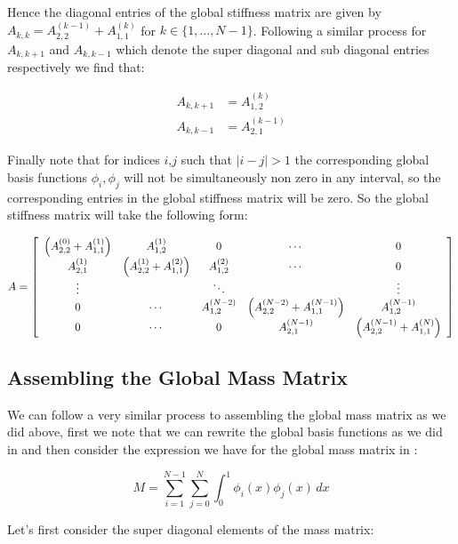Hence the diagonal entries of the global stiffness matrix are given by $A_{k,k} = A^{(k-1)}_{2,2} + A^{(k)}_{1,1}$ for
$k \in \{1, \ldots, N - 1\}$. Following a similar process for $A_{k,k+1}$ and $A_{k,k-1}$ which denote the super diagonal
and sub diagonal entries respectively we find that:

\begin{align*}
	A_{k,k+1} &= A^{(k)}_{1,2} \\
    A_{k,k-1} &= A^{(k-1)}_{2,1}
\end{align*}

Finally note that for indices $i$,$j$ such that $|i - j| > 1$ the corresponding global basis functions $\phi_i, \phi_j$
will not be simultaneously non zero in any interval, so the corresponding entries in the global stiffness matrix will be 
zero. So the global stiffness matrix will take the following form:

\begin{equation}\label{eq:oned-deterministic-global-stiffness}
	A = \left[\begin{array}{c c c c c}
    	 \left(A^{(0)}_{2,2} + A^{(1)}_{1,1}\right) & A^{(1)}_{1,2} & 0 & \cdots & 0 \\
         A^{(1)}_{2,1} & \left(A^{(1)}_{2,2} + A^{(2)}_{1,1}\right) & A^{(2)}_{1,2} & \cdots & 0 \\
         \vdots & & \ddots  & & \vdots \\
         0 & \cdots & A^{(N-2)}_{1,2} & \left(A^{(N-2)}_{2,2} + A^{(N-1)}_{1,1}\right)& A^{(N-1)}_{1,2} \\
         0 & \cdots & 0 & A^{(N-1)}_{2,1} & \left(A^{(N-1)}_{2,2} + A^{(N)}_{1,1}\right)
  		\end{array}\right]
\end{equation}

\subsection{Assembling the Global Mass Matrix}

We can follow a very similar process to assembling the global mass matrix as we did above, first we note that we can rewrite
the global basis functions as we did in  and then consider the expression
we have for the global mass matrix in :

\[
	M = \sum_{i=1}^{N-1}\sum_{j=0}^N\int_0^1\phi_i(x)\phi_j(x)\, dx
\]

Let's first consider the super diagonal elements of the mass matrix:

